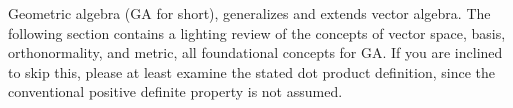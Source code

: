 %
%
Geometric algebra (GA for short), generalizes and extends vector algebra.
The following section contains a lighting review of the
concepts of vector space, basis, orthonormality, and metric, all foundational concepts for GA.
If you are inclined to skip this, please at least examine the
stated dot product definition, since the conventional positive definite property is not assumed.
